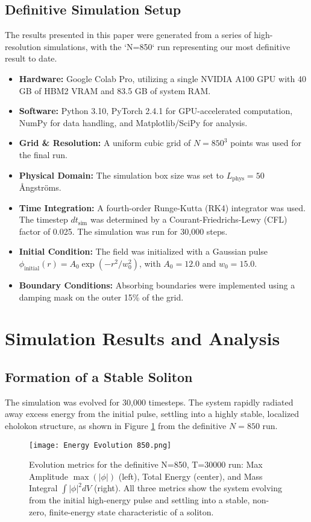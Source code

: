 \documentclass[11pt]{article}
\begin{document}
\subsection{Definitive Simulation Setup}
The results presented in this paper were generated from a series of high-resolution simulations, with the `N=850` run representing our most definitive result to date.
\begin{itemize}
    \item \textbf{Hardware:} Google Colab Pro, utilizing a single NVIDIA A100 GPU with 40 GB of HBM2 VRAM and 83.5 GB of system RAM.
    \item \textbf{Software:} Python 3.10, PyTorch 2.4.1 for GPU-accelerated computation, NumPy for data handling, and Matplotlib/SciPy for analysis.
    \item \textbf{Grid \& Resolution:} A uniform cubic grid of \(N=850^3\) points was used for the final run.
    \item \textbf{Physical Domain:} The simulation box size was set to \(L_{\text{phys}} = 50\) Ångströms.
    \item \textbf{Time Integration:} A fourth-order Runge-Kutta (RK4) integrator was used. The timestep \(dt_{\text{sim}}\) was determined by a Courant-Friedrichs-Lewy (CFL) factor of 0.025. The simulation was run for 30,000 steps.
    \item \textbf{Initial Condition:} The field was initialized with a Gaussian pulse \(\phi_{\text{initial}}(r) = A_0 \exp(-r^2/w_0^2)\), with \(A_0 = 12.0\) and \(w_0 = 15.0\).
    \item \textbf{Boundary Conditions:} Absorbing boundaries were implemented using a damping mask on the outer 15\% of the grid.
\end{itemize}

\section{Simulation Results and Analysis}

\subsection{Formation of a Stable Soliton}
The simulation was evolved for 30,000 timesteps. The system rapidly radiated away excess energy from the initial pulse, settling into a highly stable, localized eholokon structure, as shown in Figure \ref{fig:mass_gen_evolution} from the definitive \(N=850\) run.

\begin{figure}[htbp]
    \centering
    \texttt{[image: Energy Evolution 850.png]}
    \caption{Evolution metrics for the definitive N=850, T=30000 run: Max Amplitude \(\max(|\phi|)\) (left), Total Energy (center), and Mass Integral \(\int|\phi|^2dV\) (right). All three metrics show the system evolving from the initial high-energy pulse and settling into a stable, non-zero, finite-energy state characteristic of a soliton.}
    \label{fig:mass_gen_evolution}
\end{figure}
\end{document}
